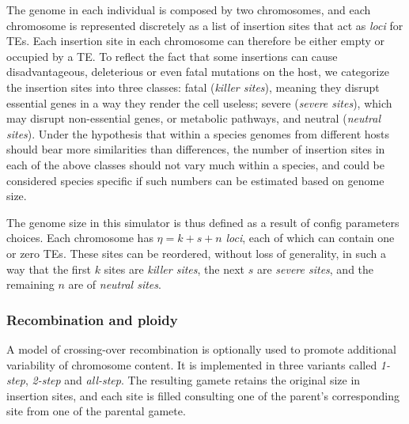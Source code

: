 \documentclass[10pt]{article}
\begin{document}
The genome in each individual is composed by two chromosomes, and each
chromosome is represented discretely as a list of insertion sites that
act as \emph{loci} for TEs. Each insertion site in each chromosome can
therefore be either empty or occupied by a TE. To reflect the fact
that some insertions can cause disadvantageous, deleterious or even
fatal mutations on the host, we categorize the insertion sites into
three classes: fatal (\emph{killer sites}), meaning they disrupt
essential genes in a way they render the cell useless; severe
(\emph{severe sites}), which may disrupt non-essential genes, or
metabolic pathways, and neutral (\emph{neutral sites}). Under the
hypothesis that within a species genomes from different hosts should
bear more similarities than differences, the number of insertion sites
in each of the above classes should not vary much within a species,
and could be considered species specific if such numbers can be
estimated based on genome size.

The genome size in this simulator is thus defined as a result of
config parameters choices. Each chromosome has $\eta = k + s + n$
\emph{loci}, each of which can contain one or zero TEs. These sites
can be reordered, without loss of generality, in such a way that the
first $k$ sites are \emph{killer sites}, the next $s$ are \emph{severe
  sites}, and the remaining $n$ are of \emph{neutral sites}.



\subsubsection{Recombination and ploidy}

A model of crossing-over recombination is optionally used to promote
additional variability of chromosome content. It is implemented in
three variants called \emph{1-step}, \emph{2-step} and
\emph{all-step}. The resulting gamete retains the original size in
insertion sites, and each site is filled consulting one of the
parent's corresponding site from one of the parental gamete.
\end{document}
